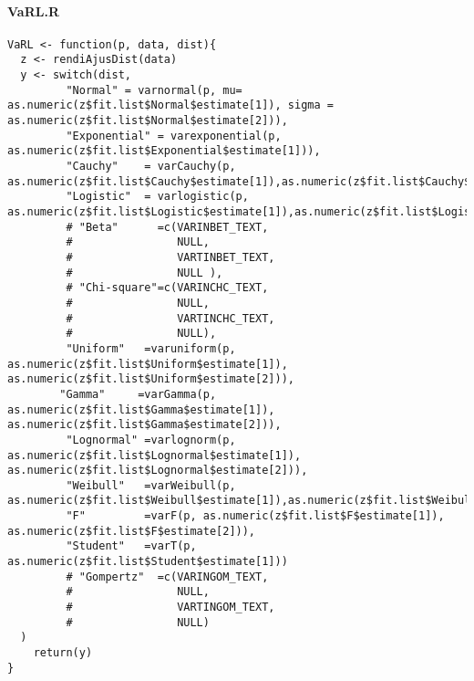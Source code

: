 \documentclass[]{article}
\begin{document}
\hypertarget{varl.r}{%
\paragraph{VaRL.R}\label{varl.r}}

\begin{verbatim}
VaRL <- function(p, data, dist){
  z <- rendiAjusDist(data)
  y <- switch(dist, 
         "Normal" = varnormal(p, mu= as.numeric(z$fit.list$Normal$estimate[1]), sigma = as.numeric(z$fit.list$Normal$estimate[2])),
         "Exponential" = varexponential(p, as.numeric(z$fit.list$Exponential$estimate[1])),
         "Cauchy"    = varCauchy(p, as.numeric(z$fit.list$Cauchy$estimate[1]),as.numeric(z$fit.list$Cauchy$estimate[2])),
         "Logistic"  = varlogistic(p, as.numeric(z$fit.list$Logistic$estimate[1]),as.numeric(z$fit.list$Logistic$estimate[2])),
         # "Beta"      =c(VARINBET_TEXT,
         #                NULL,
         #                VARTINBET_TEXT,
         #                NULL ),
         # "Chi-square"=c(VARINCHC_TEXT,
         #                NULL,
         #                VARTINCHC_TEXT,
         #                NULL),
         "Uniform"   =varuniform(p, as.numeric(z$fit.list$Uniform$estimate[1]), as.numeric(z$fit.list$Uniform$estimate[2])),
        "Gamma"     =varGamma(p, as.numeric(z$fit.list$Gamma$estimate[1]), as.numeric(z$fit.list$Gamma$estimate[2])),
         "Lognormal" =varlognorm(p, as.numeric(z$fit.list$Lognormal$estimate[1]), as.numeric(z$fit.list$Lognormal$estimate[2])),
         "Weibull"   =varWeibull(p, as.numeric(z$fit.list$Weibull$estimate[1]),as.numeric(z$fit.list$Weibull$estimate[2])),
         "F"         =varF(p, as.numeric(z$fit.list$F$estimate[1]), as.numeric(z$fit.list$F$estimate[2])),
         "Student"   =varT(p, as.numeric(z$fit.list$Student$estimate[1]))
         # "Gompertz"  =c(VARINGOM_TEXT,
         #                NULL,
         #                VARTINGOM_TEXT,
         #                NULL)
  )
    return(y)
}
\end{verbatim}
\end{document}
